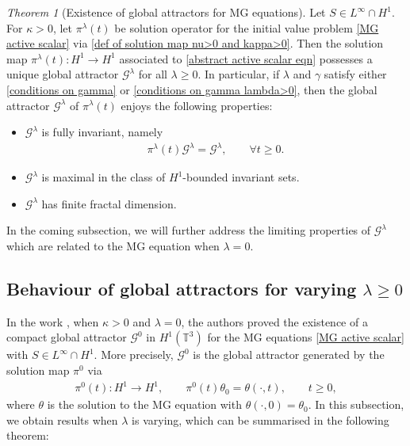 \documentclass[reqno]{amsart}%
\theoremstyle{definition}
\theoremstyle{remark}
\numberwithin{equation}{section}
\newtheorem{theorem}{Theorem}
\newcommand{\1}{\mathbf{1}}
\newcommand{\A}{\mathcal{G}^{0}}
\newcommand{\Gg}{\mathcal{G}^{\lambda}}
\newcommand{\pin}{\pi^{\lambda}}
\newcommand{\pio}{\pi^{0}}
\numberwithin{equation}{section}
\numberwithin{theorem}{section}
\numberwithin{figure}{section}
\begin{document}
\begin{theorem}[Existence of global attractors for MG equations]\label{existence of global attractor MG theorem}
Let $S\in L^\infty\cap H^1$. For $\kappa>0$, let $\pin(t)$ be solution operator for the initial value problem \eqref{MG active scalar} via \eqref{def of solution map nu>0 and kappa>0}. Then the solution map $\pin(t):H^1\to H^1$ associated to \eqref{abstract active scalar eqn} possesses a unique global attractor $\Gg$ for all $\lambda\ge0$. In particular, if $\lambda$ and $\gamma$ satisfy either \eqref{conditions on gamma} or \eqref{conditions on gamma lambda>0}, then the global attractor $\Gg$ of $\pin(t)$ enjoys the following properties:
\begin{itemize}
\item $\Gg$ is fully invariant, namely
\begin{align*}
\pin(t)\Gg=\Gg,\qquad \forall t\ge0.
\end{align*}
\item $\Gg$ is maximal in the class of $H^1$-bounded invariant sets.
\item $\Gg$ has finite fractal dimension.
\end{itemize}
\end{theorem}

In the coming subsection, we will further address the limiting properties of $\Gg$ which are related to the MG equation when $\lambda=0$.

\subsection{Behaviour of global attractors for varying $\lambda\ge0$}\label{Behaviour of global attractors section}

In the work \cite{FS21}, when $\kappa>0$ and $\lambda=0$, the authors proved the existence of a compact global attractor $\A$ in $H^1(\mathbb{T}^3)$ for the MG equations \eqref{MG active scalar} with $S\in L^\infty\cap H^1$. More precisely, $\A$ is the global attractor generated by the solution map $\pio$ via
\begin{align}\label{def of solution map nu=0 and kappa>0}
\pio(t): H^1\to H^1,\qquad \pio(t)\theta_0=\theta(\cdot,t),\qquad t\ge0,
\end{align}
where $\theta$ is the solution to the MG equation with $\theta(\cdot,0)=\theta_0$. In this subsection, we obtain results when $\lambda$ is varying, which can be summarised in the following theorem:
\end{document}
